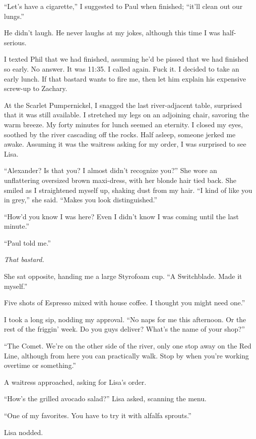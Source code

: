 ``Let's have a cigarette,'' I suggested to Paul when finished; ``it'll
clean out our lungs.''

He didn't laugh. He never laughs at my jokes, although this time I was
half-serious.

I texted Phil that we had finished, assuming he'd be pissed that we had
finished so early. No answer. It was 11:35. I called again. Fuck it. I
decided to take an early lunch. If that bastard wants to fire me, then
let him explain his expensive screw-up to Zachary.

At the Scarlet Pumpernickel, I snagged the last river-adjacent table,
surprised that it was still available. I stretched my legs on an
adjoining chair, savoring the warm breeze. My forty minutes for lunch
seemed an eternity. I closed my eyes, soothed by the river cascading off
the rocks. Half asleep, someone jerked me awake. Assuming it was the
waitress asking for my order, I was surprised to see Lisa.

``Alexander? Is that you? I almost didn't recognize you?'' She wore an
unflattering oversized brown maxi-dress, with her blonde hair tied back.
She smiled as I straightened myself up, shaking dust from my hair. ``I
kind of like you in grey,'' she said. ``Makes you look distinguished.''

``How'd you know I was here? Even I didn't know I was coming until the
last minute.''

``Paul told me.''

\emph{That bastard.}

She sat opposite, handing me a large Styrofoam cup. ``A Switchblade.
Made it myself.''

Five shots of Espresso mixed with house coffee. I thought you might need
one.''

I took a long sip, nodding my approval. ``No naps for me this afternoon.
Or the rest of the friggin' week. Do you guys deliver? What's the name
of your shop?''

``The Comet. We're on the other side of the river, only one stop away on
the Red Line, although from here you can practically walk. Stop by when
you're working overtime or something.''

A waitress approached, asking for Lisa's order.

``How's the grilled avocado salad?'' Lisa asked, scanning the menu.

``One of my favorites. You have to try it with alfalfa sprouts.''

Lisa nodded.

